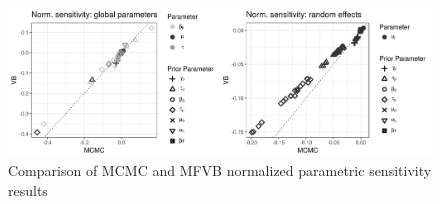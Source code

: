 \documentclass{article}\usepackage[]{graphicx}\usepackage[]{color}
\newenvironment{knitrout}{}{} %
\theoremstyle{plain}
\theoremstyle{definition}
\theoremstyle{plain}
\theoremstyle{plain}
\theoremstyle{plain}
\theoremstyle{plain}
\begin{document}
\begin{knitrout}
\color{fgcolor}\begin{figure}[!h]

{\centering \includegraphics[width=0.98\linewidth,height=0.343\linewidth]{figure/LogitGLMMParametricRobustness-1} 

}

\caption[Comparison of MCMC and MFVB normalized parametric sensitivity results]{Comparison of MCMC and MFVB normalized parametric sensitivity results}\label{fig:LogitGLMMParametricRobustness}
\end{figure}


\end{knitrout}
\end{document}
